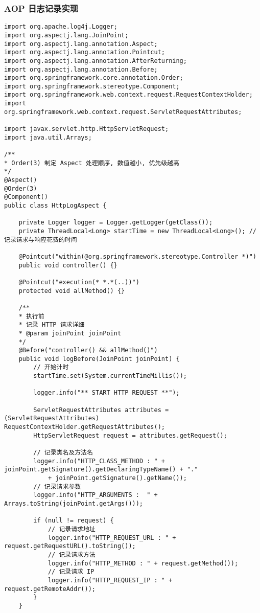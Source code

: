\subsubsection{AOP
日志记录实现}\label{aop-ux65e5ux5fd7ux8bb0ux5f55ux5b9eux73b0}

\begin{lstlisting}
import org.apache.log4j.Logger;
import org.aspectj.lang.JoinPoint;
import org.aspectj.lang.annotation.Aspect;
import org.aspectj.lang.annotation.Pointcut;
import org.aspectj.lang.annotation.AfterReturning;
import org.aspectj.lang.annotation.Before;
import org.springframework.core.annotation.Order;
import org.springframework.stereotype.Component;
import org.springframework.web.context.request.RequestContextHolder;
import org.springframework.web.context.request.ServletRequestAttributes;

import javax.servlet.http.HttpServletRequest;
import java.util.Arrays;

/**
* Order(3) 制定 Aspect 处理顺序, 数值越小, 优先级越高
*/
@Aspect()
@Order(3)
@Component()
public class HttpLogAspect {

    private Logger logger = Logger.getLogger(getClass());
    private ThreadLocal<Long> startTime = new ThreadLocal<Long>(); // 记录请求与响应花费的时间

    @Pointcut("within(@org.springframework.stereotype.Controller *)")
    public void controller() {}

    @Pointcut("execution(* *.*(..))")
    protected void allMethod() {}

    /**
    * 执行前
    * 记录 HTTP 请求详细
    * @param joinPoint joinPoint
    */
    @Before("controller() && allMethod()")
    public void logBefore(JoinPoint joinPoint) {
        // 开始计时
        startTime.set(System.currentTimeMillis());

        logger.info("** START HTTP REQUEST **");

        ServletRequestAttributes attributes = (ServletRequestAttributes) RequestContextHolder.getRequestAttributes();
        HttpServletRequest request = attributes.getRequest();

        // 记录类名及方法名
        logger.info("HTTP_CLASS_METHOD : " + joinPoint.getSignature().getDeclaringTypeName() + "."
            + joinPoint.getSignature().getName());
        // 记录请求参数
        logger.info("HTTP_ARGUMENTS :  " + Arrays.toString(joinPoint.getArgs()));

        if (null != request) {
            // 记录请求地址
            logger.info("HTTP_REQUEST_URL : " + request.getRequestURL().toString());
            // 记录请求方法
            logger.info("HTTP_METHOD : " + request.getMethod());
            // 记录请求 IP
            logger.info("HTTP_REQUEST_IP : " + request.getRemoteAddr());
        }
    }


\end{lstlisting}
